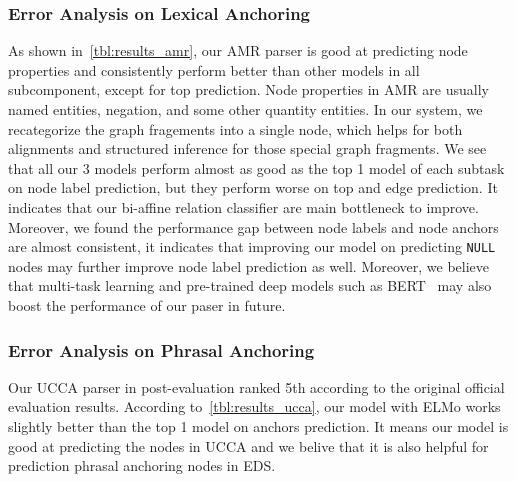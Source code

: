\subsubsection{Error Analysis on Lexical Anchoring}
\label{sssec:lex-phr:error-lex}
As shown in~\autoref{tbl:results_amr}, our AMR parser is good at
predicting node properties and consistently perform better than other
models in all subcomponent, except for top prediction. Node properties
in AMR are usually named entities, negation, and some other quantity
entities. In our system, we recategorize the graph fragements into a
single node, which helps for both alignments and structured inference
for those special graph fragments. We see that all our 3 models
perform almost as good as the top 1 model of each subtask on node
label prediction, but they perform worse on top and edge
prediction. It indicates that our bi-affine relation classifier are
main bottleneck to improve. Moreover, we found the performance gap
between node labels and node anchors are almost consistent, it
indicates that improving our model on predicting \texttt{NULL} nodes may
further improve node label prediction as well.  Moreover, we believe
that multi-task learning and pre-trained deep models such as
BERT~\citep{devlin2018bert} may also boost the performance of our paser
in future.

\subsubsection{Error Analysis on Phrasal Anchoring}
\label{sssec:lex-phr:error-phr}
Our UCCA parser in post-evaluation ranked 5th according to the
original official evaluation results. According
to~\autoref{tbl:results_ucca}, our model with ELMo works slightly
better than the top 1 model on anchors prediction. It means our model
is good at predicting the nodes in UCCA and we belive that it is also
helpful for prediction phrasal anchoring nodes in EDS.

